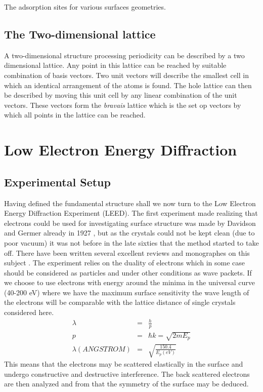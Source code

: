 \vspace*{11cm}

 The adsorption sites for various surfaces geometries.

\vspace{1cm}


\subsection{The Two-dimensional lattice}
A two-dimensional  structure processing periodicity can be described by a two dimensional lattice. Any point in this lattice can be reached by suitable combination of basis vectors. Two unit vectors will describe the smallest cell in which an identical arrangement of the atoms is found. The hole lattice can then be described by moving this unit cell by any linear combination of the unit vectors. These vectors form the {\it bravais} lattice which is the set op vectors by which all points in the lattice can be reached.



\section{Low Electron Energy Diffraction}


\subsection{Experimental Setup}
Having defined the fundamental structure shall we  now turn to the Low Electron Energy Diffraction Experiment (LEED). The first experiment made realizing that electrons could be used for investigating surface structure was made by Davidson and Germer already  in  1927 \cite{Davidson}, but as the crystals could not be kept clean (due to poor vacuum) it was not before in the late sixties that the method started to take off. There have been written several excellent reviews and monographes on this subject \cite{Pendry, Hove, Heinz, Ertl}. The experiment relies on the duality of electrons which in some case should be considered as particles and under other conditions as wave packets.  If we choose to use electrons with energy around the minima in the universal curve (40-200 eV) where we have the maximum surface sensitivity the wave length of the electrons will be comparable with the lattice distance of single crystals considered here.
\begin{eqnarray}
\lambda &=& \frac{h}{p}\\ p &=& \hbar k=\sqrt{2mE_p}\\
\lambda(ANGSTROM) &=& \sqrt{\frac{150.4}{E_p(eV)}}
\end{eqnarray}
This means that the electrons may be scattered elastically  in the surface and undergo constructive and destructive interference. The back scattered electrons are then analyzed and from that the symmetry of the surface may be deduced.

